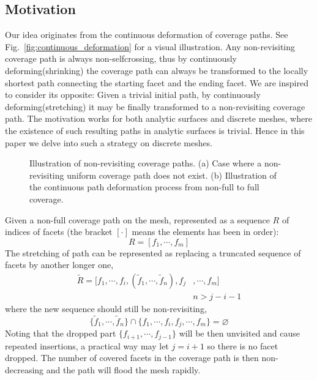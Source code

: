 \documentclass[lettersize,journal]{IEEEtran}
\begin{document}
\subsection{Motivation}
Our idea originates from the continuous deformation of coverage paths. See Fig.~\ref{fig:continuous_deformation} for a visual illustration. 
Any non-revisiting coverage path is always non-selfcrossing, thus by continuously deforming(shrinking) the coverage path can always be transformed to the locally shortest path connecting the starting facet and the ending facet. 
We are inspired to consider its opposite: Given a trivial initial path, by continuously deforming(stretching) it may be finally transformed to a non-revisiting coverage path. 
The motivation works for both analytic surfaces and discrete meshes, where the existence of such resulting paths in analytic surfaces is trivial. 
Hence in this paper we delve into such a strategy on discrete meshes. 


\begin{figure}[t]
\centering
{}
\caption{Illustration of non-revisiting coverage paths. 
(a) Case where a non-revisiting uniform coverage path does not exist. 
(b) Illustration of the continuous path deformation process from non-full to full coverage. 
}
\end{figure}

Given a non-full coverage path on the mesh, represented as a sequence $R$ of indices of facets (the bracket $[\cdot]$ means the elements has been in order): 
\begin{equation}
R = [f_1, \cdots, f_m]
\end{equation}
The stretching of path can be represented as replacing a truncated sequence of facets by another longer one, 
\begin{equation}\label{eqn:replace}
\begin{aligned}
\tilde{R} = [f_1, \cdots, f_i, (\tilde{f}_1, \cdots, \tilde{f}_{n}), f_j&, \cdots, f_m]\\
& n > j-i - 1
\end{aligned}
\end{equation}
where the new sequence should still be non-revisiting, 
\begin{equation}
\{\tilde{f}_1, \cdots, \tilde{f}_n\}\cap \{f_1, \cdots, f_i, f_j, \cdots, f_m\} = \varnothing
\end{equation}
Noting that the dropped part $\{f_{i+1}, \cdots, f_{j-1}\}$ will be then unvisited and cause repeated insertions, a practical way may let $j = i+1$ so there is no facet dropped.
The number of covered facets in the coverage path is then non-decreasing and the path will flood the mesh rapidly. 
\end{document}
